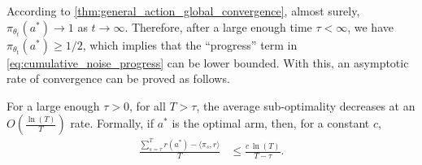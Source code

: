 According to \cref{thm:general_action_global_convergence}, almost surely, $\pi_{\theta_t}(a^*) \to 1$ as $t \to \infty$. Therefore, after a large enough time $\tau < \infty$, we have $\pi_{\theta_t}(a^*) \ge 1/2$, which implies that the ``progress'' term in \cref{eq:cumulative_noise_progress} can be lower bounded. With this, an asymptotic rate of convergence can be proved as follows.
\begin{theorem}
\label{thm:asymptotic_rate_of_convergence}
For a large enough $\tau > 0$, for all $T > \tau$, the average sub-optimality decreases at an $O\left(\frac{\ln(T)}{T} \right)$ rate. Formally, if $a^*$ is the optimal arm, then, for a constant $c$,
\begin{align*}
\frac{\sum_{s=\tau}^{T} r(a^*) - \langle \pi_s, r \rangle}{T}  & \leq \frac{c \, \ln(T)}{T - \tau}.
\end{align*}
\end{theorem}


